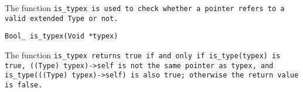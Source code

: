 The function \tt{is_typex} is used to check whether a pointer
refers to a valid extended \tt{Type} or not.


\tt{Bool_ is_typex(Void *typex)}

\enlargethispage*{\baselineskip}
\enlargethispage*{\baselineskip}
\enlargethispage*{\baselineskip}


The function \tt{is_typex} returns \tt{true} if and only if \tt{is_type(typex)} is \tt{true},
\tt{((Type) typex)->self} is not the same pointer as \tt{typex},
and \tt{is_type(((Type) typex)->self)} is also \tt{true};
otherwise the return value is \tt{false}.
